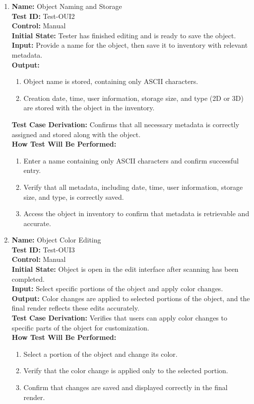\documentclass[12pt, titlepage]{article}
\begin{document}
\begin{enumerate}
  \item \textbf{Name:} Object Naming and Storage \label{itm:Test-OUI2} \\
  \textbf{Test ID:} Test-OUI2 \\
  \textbf{Control:} Manual \\
  \textbf{Initial State:} Tester has finished editing and is ready to save the object. \\
  \textbf{Input:} Provide a name for the object, then save it to inventory with relevant metadata. \\
  \textbf{Output:}
  \begin{enumerate}
      \item Object name is stored, containing only ASCII characters.
      \item Creation date, time, user information, storage size, and type (2D or 3D) are stored with the object in the inventory.
  \end{enumerate}
  \textbf{Test Case Derivation:} Confirms that all necessary metadata is correctly assigned and stored along with the object. \\
  \textbf{How Test Will Be Performed:}
  \begin{enumerate}
      \item Enter a name containing only ASCII characters and confirm successful entry.
      \item Verify that all metadata, including date, time, user information, storage size, and type, is correctly saved.
      \item Access the object in inventory to confirm that metadata is retrievable and accurate.
  \end{enumerate}

  \item \textbf{Name:} Object Color Editing \label{itm:Test-OUI3} \\
  \textbf{Test ID:} Test-OUI3 \\
  \textbf{Control:} Manual \\
  \textbf{Initial State:} Object is open in the edit interface after scanning has been completed. \\
  \textbf{Input:} Select specific portions of the object and apply color changes. \\
  \textbf{Output:} Color changes are applied to selected portions of the object, and the final render reflects these edits accurately. \\
  \textbf{Test Case Derivation:} Verifies that users can apply color changes to specific parts of the object for customization. \\
  \textbf{How Test Will Be Performed:}
  \begin{enumerate}
      \item Select a portion of the object and change its color.
      \item Verify that the color change is applied only to the selected portion.
      \item Confirm that changes are saved and displayed correctly in the final render.
  \end{enumerate}

\end{enumerate}
\end{document}
